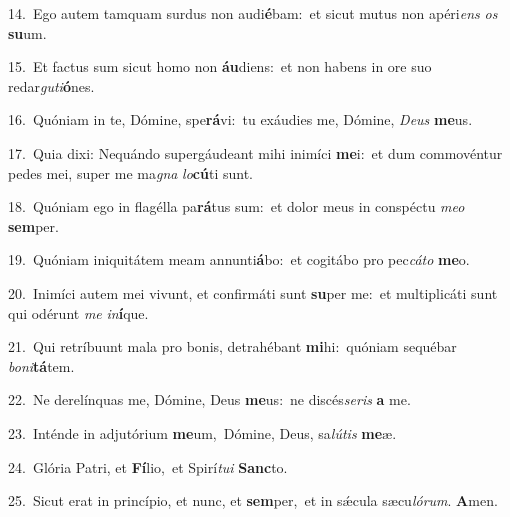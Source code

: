 {\numbfont\textcolor{\numbcolor}{14.}}~Ego autem tamquam surdus non audi\-\textbf{é}\-bam:~\star et sicut mutus non apéri\textit{ens} \textit{os} \textbf{su}\-um.\par
{\numbfont\textcolor{\numbcolor}{15.}}~Et factus sum sicut homo non \textbf{áu}\-diens:~\star et non habens in ore suo redar\-\textit{gu}\-\textit{ti}\textbf{ó}nes.\par
{\numbfont\textcolor{\numbcolor}{16.}}~Quóniam in te, Dómine, spe\-\textbf{rá}\-vi:~\star tu exáudies me, Dómine, \textit{De}\-\textit{us} \textbf{me}\-us.\par
{\numbfont\textcolor{\numbcolor}{17.}}~Quia dixi: Nequándo supergáudeant mihi inimíci \textbf{me}\-i:~\star et dum commovéntur pedes mei, super me ma\textit{gna} \textit{lo}\-\textbf{cú}ti sunt.\par
{\numbfont\textcolor{\numbcolor}{18.}}~Quóniam ego in flagélla pa\-\textbf{rá}\-tus sum:~\star et dolor meus in conspéctu \textit{me}\-\textit{o} \textbf{sem}\-per.\par
{\numbfont\textcolor{\numbcolor}{19.}}~Quóniam iniquitátem meam annunti\-\textbf{á}\-bo:~\star et cogitábo pro pec\-\textit{cá}\-\textit{to} \textbf{me}\-o.\par
{\numbfont\textcolor{\numbcolor}{20.}}~Inimíci autem mei vivunt, et confirmáti sunt \textbf{su}\-per me:~\star et multiplicáti sunt qui odérunt \textit{me} \textit{in}\-\textbf{í}que.\par
{\numbfont\textcolor{\numbcolor}{21.}}~Qui retríbuunt mala pro bonis, detrahébant \textbf{mi}\-hi:~\star quóniam sequébar \textit{bo}\-\textit{ni}\textbf{tá}tem.\par
{\numbfont\textcolor{\numbcolor}{22.}}~Ne derelínquas me, Dómine, Deus \textbf{me}\-us:~\star ne discés\-\textit{se}\-\textit{ris} \textbf{a} me.\par
{\numbfont\textcolor{\numbcolor}{23.}}~Inténde in adjutórium \textbf{me}\-um,~\star Dómine, Deus, sa\-\textit{lú}\-\textit{tis} \textbf{me}\-æ.\par
{\numbfont\textcolor{\numbcolor}{24.}}~Glória Patri, et \textbf{Fí}\-lio,~\star et Spirí\-\textit{tu}\-\textit{i} \textbf{Sanc}\-to.\par
{\numbfont\textcolor{\numbcolor}{25.}}~Sicut erat in princípio, et nunc, et \textbf{sem}\-per,~\star et in sǽcula sæcu\-\textit{ló}\-\textit{rum}. \textbf{A}\-men.\par
